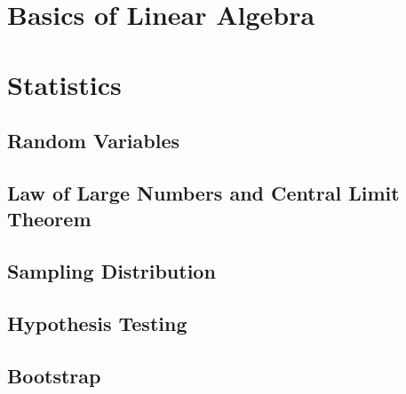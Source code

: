 \ifdefined\printmath

\part{Basics of Linear Algebra}






\part{Statistics}
\chapter{Random Variables}


\chapter{Law of Large Numbers and Central Limit Theorem}


\chapter{Sampling Distribution}


\chapter{Hypothesis Testing}


\chapter{Bootstrap}

\fi
